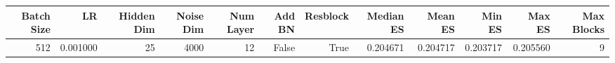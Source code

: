 \begin{tabular}{rrrrrrrrrrrr}
\toprule
Batch Size & LR & Hidden Dim & Noise Dim & Num Layer & Add BN & Resblock & Median ES & Mean ES & Min ES & Max ES & Max Blocks \\
\midrule
512 & 0.001000 & 25 & 4000 & 12 & False & True & 0.204671 & 0.204717 & 0.203717 & 0.205560 & 9 \\
\bottomrule
\end{tabular}
